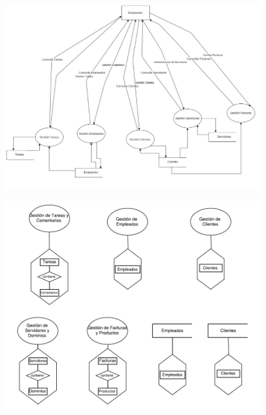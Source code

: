 \documentclass[paper=a4, fontsize=11pt, spanish]{scrartcl}
\begin{document}
\begin{figure}
	\includegraphics[width=1.20\textwidth]{PrimerRefF.png}
	\caption{}
	\label{fig:primerRefF}
\end{figure}

\begin{figure}
	\includegraphics[width=1.25\textwidth]{EsqExtF.png}
	\caption{}
	\label{fig:EsqExtF}
\end{figure}
\end{document}
